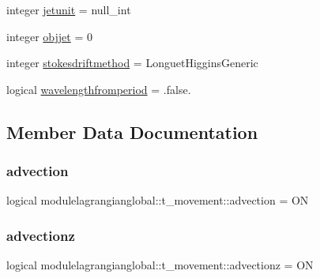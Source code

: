\begin{DoxyCompactItemize}
\item 
integer \mbox{\hyperlink{structmodulelagrangianglobal_1_1t__movement_a9625d8fec597c2bb86eab542004de2b0}{jetunit}} = null\+\_\+int
\item 
integer \mbox{\hyperlink{structmodulelagrangianglobal_1_1t__movement_afba9e53dacbfe2fe6ad1a62cb90598fa}{objjet}} = 0
\item 
integer \mbox{\hyperlink{structmodulelagrangianglobal_1_1t__movement_abdca46cf9c2f193e431fcccefded87bc}{stokesdriftmethod}} = Longuet\+Higgins\+Generic
\item 
logical \mbox{\hyperlink{structmodulelagrangianglobal_1_1t__movement_a980f49b4821d130ef5bd96c479957bd3}{wavelengthfromperiod}} = .false.
\end{DoxyCompactItemize}


\subsection{Member Data Documentation}
\mbox{\label{structmodulelagrangianglobal_1_1t__movement_aef3b9083c0845f19936cb7650b64e251}} 
\subsubsection{\texorpdfstring{advection}{advection}}
{\footnotesize\ttfamily logical modulelagrangianglobal\+::t\+\_\+movement\+::advection = ON\hspace{0.3cm}{\ttfamily [private]}}

\mbox{\label{structmodulelagrangianglobal_1_1t__movement_a3f674283030e2cf526e374e96205ae60}} 
\subsubsection{\texorpdfstring{advectionz}{advectionz}}
{\footnotesize\ttfamily logical modulelagrangianglobal\+::t\+\_\+movement\+::advectionz = ON\hspace{0.3cm}{\ttfamily [private]}}


